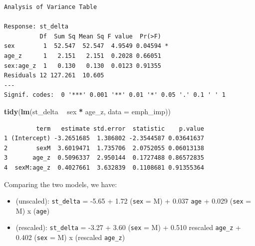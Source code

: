 \documentclass[]{book}
\newenvironment{Shaded}{\begin{snugshade}}{\end{snugshade}}
\newcommand{\KeywordTok}[1]{\textcolor[rgb]{0.13,0.29,0.53}{\textbf{#1}}}
\newcommand{\DataTypeTok}[1]{\textcolor[rgb]{0.13,0.29,0.53}{#1}}
\newcommand{\DecValTok}[1]{\textcolor[rgb]{0.00,0.00,0.81}{#1}}
\newcommand{\StringTok}[1]{\textcolor[rgb]{0.31,0.60,0.02}{#1}}
\newcommand{\OperatorTok}[1]{\textcolor[rgb]{0.81,0.36,0.00}{\textbf{#1}}}
\newcommand{\NormalTok}[1]{#1}
\providecommand{\tightlist}{%
  \setlength{\itemsep}{0pt}\setlength{\parskip}{0pt}}
\theoremstyle{definition}
\theoremstyle{definition}
\theoremstyle{definition}
\theoremstyle{remark}
\begin{document}
\begin{Shaded}
\end{Shaded}

\begin{verbatim}
Analysis of Variance Table

Response: st_delta
          Df  Sum Sq Mean Sq F value  Pr(>F)  
sex        1  52.547  52.547  4.9549 0.04594 *
age_z      1   2.151   2.151  0.2028 0.66051  
sex:age_z  1   0.130   0.130  0.0123 0.91355  
Residuals 12 127.261  10.605                  
---
Signif. codes:  0 '***' 0.001 '**' 0.01 '*' 0.05 '.' 0.1 ' ' 1
\end{verbatim}

\begin{Shaded}
\begin{Highlighting}[]
\KeywordTok{tidy}\NormalTok{(}\KeywordTok{lm}\NormalTok{(st_delta }\OperatorTok{~}\StringTok{ }\NormalTok{sex }\OperatorTok{*}\StringTok{ }\NormalTok{age_z, }\DataTypeTok{data =}\NormalTok{ emph_imp))}
\end{Highlighting}
\end{Shaded}

\begin{verbatim}
         term   estimate std.error  statistic    p.value
1 (Intercept) -3.2651685  1.386802 -2.3544587 0.03641637
2        sexM  3.6019471  1.735706  2.0752055 0.06013138
3       age_z  0.5096337  2.950144  0.1727488 0.86572835
4  sexM:age_z  0.4027661  3.632839  0.1108681 0.91355364
\end{verbatim}

Comparing the two models, we have:

\begin{itemize}
\tightlist
\item
  (unscaled): \texttt{st\_delta} = -5.65 + 1.72 (\texttt{sex} = M) +
  0.037 \texttt{age} + 0.029 (\texttt{sex} = M) x (\texttt{age})
\item
  (rescaled): \texttt{st\_delta} = -3.27 + 3.60 (\texttt{sex} = M) +
  0.510 rescaled \texttt{age\_z} + 0.402 (\texttt{sex} = M) x (rescaled
  \texttt{age\_z})
\end{itemize}
\end{document}
